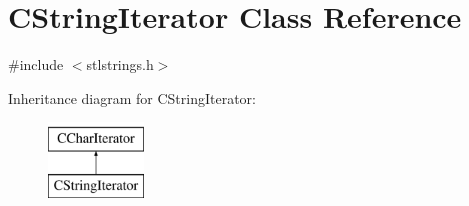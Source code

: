 \hypertarget{classCStringIterator}{\section{C\-String\-Iterator Class Reference}
\label{classCStringIterator}
}


{\ttfamily \#include $<$stlstrings.\-h$>$}

Inheritance diagram for C\-String\-Iterator\-:\begin{figure}[H]
\begin{center}
\leavevmode
\includegraphics[height=2.000000cm]{df/d30/classCStringIterator}
\end{center}
\end{figure}
